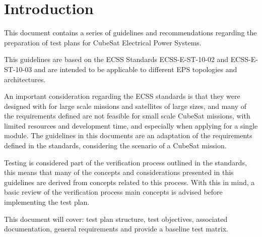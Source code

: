 %
%
%
%
%

%
%
%
%
%

\chapter{Introduction} \label{ch:introduction}

This document contains a series of guidelines and recommendations regarding the preparation of test plans for CubeSat Electrical Power Systems.

This guidelines are based on the ECSS Standards ECSS-E-ST-10-02 \cite{ecss-e-st-10-02} and ECSS-E-ST-10-03 \cite{ecss-e-st-10-03} and are intended to be applicable to different EPS topologies and architectures.

An important consideration regarding the ECSS standards is that they were designed with for large scale missions and satellites of large sizes, and many of the requirements defined are not feasible for small scale CubeSat missions, with limited resources and development time, and especially when applying for a single module.
The guidelines in this documents are an adaptation of the requirements defined in the standards, considering the scenario of a CubeSat mission.

Testing is considered part of the verification process outlined in the standards, this means that many of the concepts and considerations presented in this guidelines are derived from concepts related to this process.
With this in mind, a basic review of the verification process main concepts is advised before implementing the test plan.

This document will cover: test plan structure, test objectives, associated documentation, general requirements and provide a baseline test matrix.